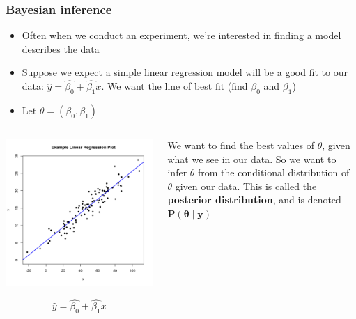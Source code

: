 \documentclass[11pt]{beamer}
\begin{document}
\frame
{
\frametitle{Bayesian inference}
	\begin{itemize}
	\item Often when we conduct an experiment, we're interested in finding a model describes the data
	\item Suppose we expect a simple linear regression model will be a good fit to our data: ${\hat{y}} = \hat{\beta_0} + \hat{\beta_1}x$. We want the line of best fit (find $\beta_0$ and $\beta_1$)
	\item Let $\theta = (\beta_0, \beta_1)$
	\end{itemize}
}


\begin{frame}[t]
\begin{columns}[T] %
\begin{column}{.60\textwidth}
 \includegraphics[scale=0.4]{ExampleLinReg.pdf} 
 {\vspace{-0.1in}}

 \begin{equation*}
 \hat{y} = \hat{\beta_0} + \hat{\beta_1} x
 \end{equation*}

\end{column}%
\hfill%
\begin{column}{.40\textwidth}

 We want to find the best values of $\theta$, given what we see in our data. So we want to infer $\theta$ from the conditional distribution of $\theta$ given our data. This is called the {\textbf{posterior distribution}}, and is denoted $\mathbf{P(\theta \mid y)}$

\end{column}%
\end{columns}
\end{frame}
\end{document}
